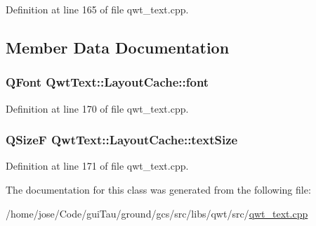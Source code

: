Definition at line 165 of file qwt\-\_\-text.\-cpp.



\subsection{Member Data Documentation}
\hypertarget{class_qwt_text_1_1_layout_cache_a41da194df363ac876bee81044a6e64ed}{
\subsubsection[{font}]{\setlength{\rightskip}{0pt plus 5cm}Q\-Font Qwt\-Text\-::\-Layout\-Cache\-::font}}\label{class_qwt_text_1_1_layout_cache_a41da194df363ac876bee81044a6e64ed}


Definition at line 170 of file qwt\-\_\-text.\-cpp.

\hypertarget{class_qwt_text_1_1_layout_cache_a91d31e4e2006a8ece1c3bb5cf20469fa}{
\subsubsection[{text\-Size}]{\setlength{\rightskip}{0pt plus 5cm}Q\-Size\-F Qwt\-Text\-::\-Layout\-Cache\-::text\-Size}}\label{class_qwt_text_1_1_layout_cache_a91d31e4e2006a8ece1c3bb5cf20469fa}


Definition at line 171 of file qwt\-\_\-text.\-cpp.



The documentation for this class was generated from the following file\-:\begin{DoxyCompactItemize}
\item 
/home/jose/\-Code/gui\-Tau/ground/gcs/src/libs/qwt/src/\hyperlink{qwt__text_8cpp}{qwt\-\_\-text.\-cpp}\end{DoxyCompactItemize}
